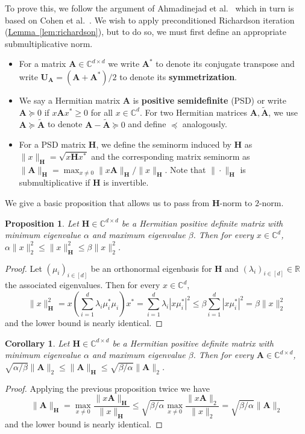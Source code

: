 \documentclass[11pt]{article}
\numberwithin{equation}{section}
\newtheorem{proposition}[theorem]{Proposition}
\newtheorem{corollary}[theorem]{Corollary}
\theoremstyle{definition}
\theoremstyle{plain}
\newcommand{\C}{\mathbb C}
\newcommand{\R}{\mathbb R}
\newcommand{\expref}[2]{\hyperref[#2]{#1~\ref{#2}}}
\newcommand{\mA}{\mathbf{A}}
\newcommand{\mH}{\mathbf{H}}
\newcommand{\mU}{\mathbf{U}}
\newcommand{\mtA}{\widetilde{\mA}}
\newcommand{\sym}[1][ ]{\mU_{#1}}
\begin{document}
To prove this, we follow the argument of %
Ahmadinejad %
et al.~\cite{AhmadinejadKeMuPeSiVa19} which in turn is based on Cohen et al.~\cite{CKPPRSV17}. We wish to apply preconditioned Richardson iteration (\expref{Lemma}{lem:richardson}), but to do so, we must first define an appropriate submultiplicative
%
norm. 
\begin{itemize}
        \item For a matrix $\mA \in \C^{d \times d}$ we write $\mA^*$ to denote its conjugate transpose and write $\sym[\mA]=(\mA+\mA^*)/2$ to denote its \textbf{symmetrization}.
        \item We say a Hermitian matrix $\mA$ is \textbf{positive semidefinite} (PSD) or write $\mA \succeq 0$ if $x\mA x^*\geq 0$ for all $x \in \C^d$. For two Hermitian matrices $\mA, \mtA$, we use $\mA\succeq \mtA$ to denote $\mA-\mtA\succeq 0$ and define $\preceq$ analogously.
        \item For a PSD matrix $\mH$, we define the seminorm induced by $\mH$ as $\|x\|_\mH=\sqrt{x\mH x^*}$ and the corresponding matrix seminorm as $\|\mA\|_{\mH} = \max_{x\neq 0}\|x\mA \|_{\mH}/\|x\|_{\mH}$. Note that $\|\cdot\|_{\mH}$ is submultiplicative if $\mH$ is invertible. 
    \end{itemize}
    We give a basic proposition that allows us to pass from $\mH$-norm to $2$-norm.
    \begin{proposition}
        Let $\mH\in \C^{d\times d}$ be a Hermitian positive definite matrix with minimum eigenvalue $\alpha$ and maximum eigenvalue $\beta$. Then for every $x \in \C^d$, $\alpha \|x\|_2^2\leq \|x\|^2_\mH\leq \beta\|x\|_2^2$.
    \end{proposition}
    \begin{proof}
    Let $(\mu_i)_{i\in[d]}$ be an orthonormal eigenbasis for $\mH$ and $(\lambda_i)_{i\in [d]} \in \R$ the associated eigenvalues. Then for every $x\in \C^d$,  
    \[\|x\|^2_\mH = x\left(\sum_{i=1}^d\lambda_i\mu_i^*\mu_i\right)x^*  = \sum_{i=1}^d \lambda_i |x\mu_i^*|^2 \leq \beta \sum_{i=1}^d |x\mu_i^*|^2=\beta \|x\|_2^2\]
    and the lower bound is nearly identical.
    \end{proof}
    \begin{corollary}\label{prop:condNumber}
        Let $\mH\in \C^{d\times d}$ be a Hermitian positive definite matrix with minimum eigenvalue $\alpha$ and maximum eigenvalue $\beta$. Then for every $\mA \in \C^{d\times d}$, $\sqrt{\alpha/\beta}\|\mA\|_2\leq \|\mA\|_\mH\leq \sqrt{\beta/\alpha}\|\mA\|_2$.
    \end{corollary}
    \begin{proof}
    Applying the previous proposition twice we have
    \[\|\mA\|_{\mH} = \max_{x\neq 0}\frac{\|x\mA\|_{\mH}}{\|x\|_{\mH}}\leq \sqrt{\beta/\alpha}\max_{x\neq 0}\frac{\|x\mA\|_2}{\|x\|_2} = \sqrt{\beta/\alpha}\|\mA\|_2\]
    and the lower bound is nearly identical.
    \end{proof}
    
\end{document}
